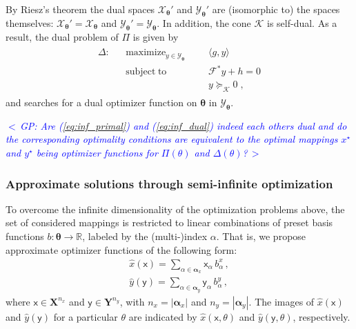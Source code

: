 \documentclass{article}
\DeclareMathOperator*{\maximize}{maximize}
\DeclareMathOperator*{\subj}{subject\;to}
\newcommand{\commentGP}[1]{\noindent \textcolor{blue}{\emph{$<\,$GP: #1$\,>$}}}%
\newcommand{\R}{\mathbb{R}}         %
\newcommand{\opt}{\star}                    %
\newcommand{\ppar}{\theta}                          %
\newcommand{\Ppar}{{\bm{\theta}}}                   %
\newcommand{\X}{\mathbf{X}}                         %
\newcommand{\Y}{\mathbf{Y}}                         %
\newcommand{\K}{\mathbf{K}}                         %
\newcommand{\calF}{\mathcal{F}}                     %
\newcommand{\Xm}{{\bm{\mathcal{X}}_{\Ppar}}}        %
\newcommand{\Ym}{{\bm{\mathcal{Y}}_{\Ppar}}}        %
\newcommand{\Km}{{\bm{\mathcal{K}}}}                %
\newcommand{\bx}{b^x}               %
\newcommand{\bxa}{\bx_\alpha}       %
\newcommand{\cx}{\textsf{x}}        %
\newcommand{\cxa}{\cx_\alpha}       %
\newcommand{\nx}{{n_x}}             %
\newcommand{\by}{b^y}               %
\newcommand{\bya}{\by_\alpha}       %
\newcommand{\cy}{\textsf{y}}        %
\newcommand{\cya}{\cy_\alpha}       %
\newcommand{\ny}{{n_y}}             %
\newcommand{\Alpha}{\bm{\alpha}}    %
\begin{document}
By Riesz's theorem the dual spaces $\Xm'$ and $\Ym'$ are (isomorphic to) the spaces themselves: $\Xm'=\Xm$ and $\Ym'=\Ym$. In addition, the cone $\Km$ is self-dual. As a result, the dual problem of $\Pi$ is given by
\begin{gather}\label{eq:inf_dual}
\begin{aligned}
\Delta: && \maximize_{y\in\Ym} &&& \langle g , y \rangle\\
        && \subj               &&& \calF^* y + h = 0 \\%
        &&                     &&& y \succeq_\Km 0 \;,%
\end{aligned}
\end{gather}
and searches for a dual optimizer function on $\Ppar$ in $\Ym$.

\commentGP{Are (\ref{eq:inf_primal}) and (\ref{eq:inf_dual}) indeed each others dual and do the corresponding optimality conditions are equivalent to the optimal mappings $x^\opt$ and $y^\opt$ being optimizer functions for $\Pi(\ppar)$ and $\Delta(\ppar)$?}


\subsubsection{Approximate solutions through semi-infinite optimization}%

To overcome the infinite dimensionality of the optimization problems above, the set of considered mappings is restricted to linear combinations of preset basis functions $b:\Ppar\rightarrow\R$, labeled by the (multi-)index $\alpha$. That is, we propose approximate optimizer functions of the following form:
\begin{subequations}\label{eq:xy_approx}
\begin{gather}
\hat{x}(\cx) = \sum_{\alpha\in\Alpha_x} \cxa \, \bxa \,, \label{eq:x_approx} \\%
\hat{y}(\cy) = \sum_{\alpha\in\Alpha_y} \cya \, \bya \,, \label{eq:y_approx}%
\end{gather}
\end{subequations}
where $\cx\in\X^\nx$ and $\cy\in\Y^\ny$, with $\nx=|\Alpha_x|$ and $\ny=|\Alpha_y|$. The images of $\hat{x}(\cx)$ and $\hat{y}(\cy)$ for a particular $\theta$ are indicated by $\hat{x}(\cx,\ppar)$ and $\hat{y}(\cy,\ppar)$, respectively.
\end{document}
